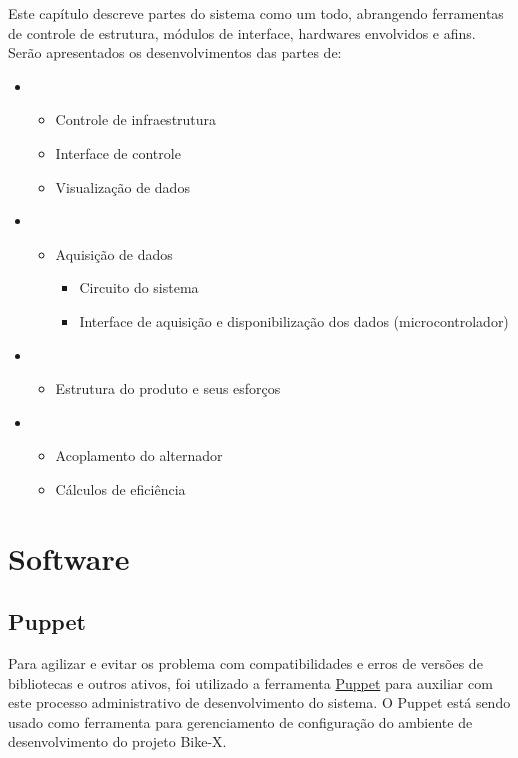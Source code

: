Este capítulo descreve partes do sistema como um todo, abrangendo ferramentas de controle de estrutura, módulos de interface, hardwares envolvidos e afins. Serão apresentados os desenvolvimentos das partes de:

\begin{itemize}
	\item {}
	\begin{itemize}
		\item Controle de infraestrutura
		\item Interface de controle
		\item Visualização de dados
	\end{itemize}
	\item {}
	\begin{itemize}
		\item Aquisição de dados
		\begin{itemize}
			\item Circuito do sistema
			\item Interface de aquisição e disponibilização dos dados (microcontrolador)
		\end{itemize}
	\end{itemize}
	\item {}
	\begin{itemize}
		\item Estrutura do produto e seus esforços
	\end{itemize}
	\item {}
	\begin{itemize}
		\item Acoplamento do alternador
		\item Cálculos de eficiência
	\end{itemize}
\end{itemize}


\chapter{Software}
\label{software}

\section{Puppet} %
\label{sec:puppet}

Para agilizar e evitar os problema com compatibilidades e erros de versões de bibliotecas e outros ativos, foi utilizado a ferramenta \href{http://puppetlabs.com}{Puppet} para auxiliar com este processo administrativo de desenvolvimento do sistema. O Puppet está sendo usado como ferramenta para gerenciamento de configuração do ambiente de desenvolvimento do projeto Bike-X.

